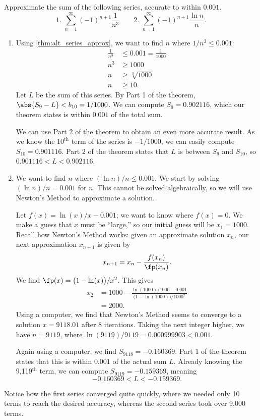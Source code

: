 \begin{example}\label{ex_alt_series_approx}
Approximate the sum of the following series, accurate to within $0.001$.
\[
 \text{1. }\sum_{n=1}^\infty (-1)^{n+1}\frac{1}{n^3}\qquad
 \text{2. }\sum_{n=1}^\infty (-1)^{n+1}\frac{\ln n}{n}.
\]
\solution
\begin{enumerate}
	\item  Using \autoref{thm:alt_series_approx}, we want to find $n$ where $1/n^3 \le 0.001$:
	\begin{align*}
	\frac1{n^3} &\leq 0.001=\frac{1}{1000} \\
	n^3 &\geq 1000\\
	n &\geq \sqrt[3]{1000}\\
	n &\geq 10.
	\end{align*}
	Let $L$ be the sum of this series. By Part 1 of the theorem, $\abs{S_9-L}<b_{10} = 1/1000$. We can compute $S_9=0.902116$, which our theorem states is within $0.001$ of the total sum. 
	
	We can use Part 2 of the theorem to obtain an even more accurate result. As we know the $10^\text{th}$ term of the series is $-1/1000$, we can easily compute $S_{10} = 0.901116$. Part 2 of the theorem states that $L$ is between $S_9$ and $S_{10}$, so $0.901116 <L<0.902116$.
	
	\item		We want to find $n$ where $(\ln n)/n \le 0.001$. We start by solving $(\ln n)/n = 0.001$ for $n$. This cannot be solved algebraically, so we will use Newton's Method to approximate a solution. 
	
	Let $f(x) = \ln(x)/x-0.001$; we want to know where $f(x) = 0$. We make a guess that $x$ must be ``large,'' so our initial guess will be $x_1=1000$. Recall how Newton's Method works: given an approximate solution $x_n$, our next approximation $x_{n+1}$ is given by
	\[x_{n+1} = x_n - \frac{f(x_n)}{\fp(x_n)}.\]
	We find $\fp(x) = \bigl(1-\ln(x)\bigr)/x^2$. This gives
	\begin{align*}
	x_2 &= 1000 - \frac{\ln(1000)/1000-0.001}{\bigl(1-\ln(1000)\bigr)/1000^2} \\
			&= 2000.
	\end{align*}
	Using a computer, we find that Newton's Method seems to converge to a solution $x=9118.01$ after 8 iterations. Taking the next integer higher, we have $n=9119$, where $\ln(9119)/9119 =0.000999903<0.001$.
	
	Again using a computer, we find $S_{9118} = -0.160369$. Part 1 of the theorem states that this is within $0.001$ of the actual sum $L$. Already knowing the 9,119$^\text{th}$ term, we can compute $S_{9119} = -0.159369$, meaning
	\[-0.160369 < L < -0.159369.\]
	
\end{enumerate}
Notice how the first series converged quite quickly, where we needed only 10 terms to reach the desired accuracy, whereas the second series took over 9,000 terms.
\end{example}

